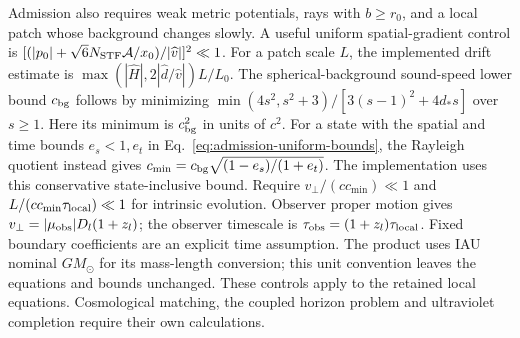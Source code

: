 Admission also requires weak metric potentials, rays with $b\ge r_0$,
and a local patch whose background changes slowly. A useful uniform
spatial-gradient control is
$[(|p_0|+\sqrt6N_{\rm STF}\mathcal A/x_0)/|\widehat v|]^2\ll1$.
For a patch scale $L$, the implemented drift estimate is
$\max(|\widehat H|,2|\widehat d/\widehat v|)L/L_0$.
The spherical-background sound-speed lower bound $c_{\rm bg}$ follows by minimizing
$\min(4s^2,s^2+3)/[3(s-1)^2+4d_*s]$ over $s\ge1$.
Here its minimum is $c_{\rm bg}^2$ in units of $c^2$.
For a state with the spatial and time bounds $e_s<1,e_t$ in
Eq.~\eqref{eq:admission-uniform-bounds}, the Rayleigh quotient instead gives
$c_{\min}=c_{\rm bg}\sqrt{(1-e_s)/(1+e_t)}$.
The implementation uses this conservative state-inclusive bound. Require
$v_\perp/(cc_{\min})\ll1$ and
$L/(cc_{\min}\tau_{\rm local})\ll1$ for intrinsic evolution.
Observer proper motion gives $v_\perp=|\mu_{\rm obs}|D_l(1+z_l)$;
the observer timescale is $\tau_{\rm obs}=(1+z_l)\tau_{\rm local}$.
Fixed boundary coefficients are an explicit time assumption.
The product uses IAU nominal $GM_\odot$ for its mass-length conversion;
this unit convention leaves the equations and bounds unchanged.
These controls apply to the retained local equations. Cosmological
matching, the coupled horizon problem and ultraviolet completion require
their own calculations.
